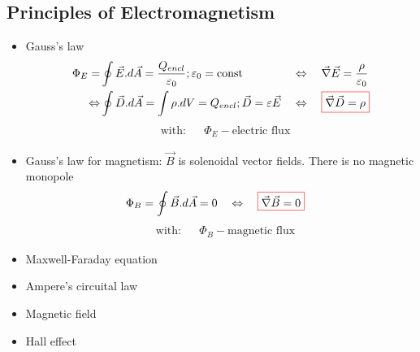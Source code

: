 \subsection{Principles of Electromagnetism}
\begin{itemize}
	\item Gauss's law
	\begin{align}
		\Phi_E = &\oint \vec{E}.d\vec{A} = \frac{Q_{encl}}{\varepsilon_0}; \varepsilon_0 = \text{const} &&\Leftrightarrow\quad \vec{\nabla}\vec{E} = \frac{\rho}{\varepsilon_0}\\
		\Leftrightarrow &\oint \vec{D}.d\vec{A} = \int \rho.dV = Q_{encl}; \vec{D} = \varepsilon \vec{E} &&\Leftrightarrow\quad {\color{red} \boxed{\color{black} \vec{\nabla} \vec{D} = \rho}}
	\end{align}
	\begin{align*}
		&\text{with:} &&\Phi_E - \text{electric flux}
	\end{align*}
	\item Gauss's law for magnetism: $\vec{B}$ is solenoidal vector fields. There is no magnetic monopole \todo{} 
	\begin{align}
		&\Phi_B = \oint \vec{B}.d\vec{A} = 0 &&\Leftrightarrow\quad {\color{red} \boxed{\color{black} \vec{\nabla}\vec{B} = 0}}
	\end{align}
	\begin{align*}
		&\text{with:} &&\Phi_B - \text{magnetic flux}
	\end{align*}
	\item Maxwell-Faraday equation
	\item Ampere's circuital law
	\item Magnetic field
	\item Hall effect
\end{itemize}
